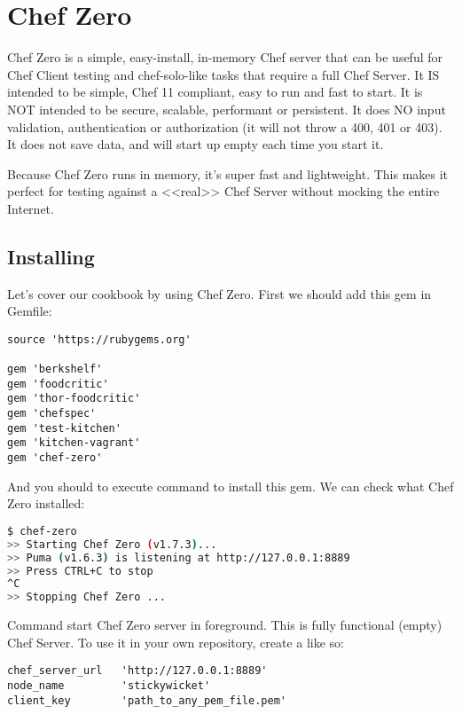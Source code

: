 \section{Chef Zero}
\label{sec:testing-chef-zero}

Chef Zero is a simple, easy-install, in-memory Chef server that can be useful for Chef Client testing and chef-solo-like tasks that require a full Chef Server. It IS intended to be simple, Chef 11 compliant, easy to run and fast to start. It is NOT intended to be secure, scalable, performant or persistent. It does NO input validation, authentication or authorization (it will not throw a 400, 401 or 403). It does not save data, and will start up empty each time you start it.

Because Chef Zero runs in memory, it's super fast and lightweight. This makes it perfect for testing against a <<real>> Chef Server without mocking the entire Internet.

\subsection{Installing}

Let's cover our cookbook by using Chef Zero. First we should add this gem in Gemfile:

\begin{lstlisting}[label=lst:testing-chef-zero1]
source 'https://rubygems.org'

gem 'berkshelf'
gem 'foodcritic'
gem 'thor-foodcritic'
gem 'chefspec'
gem 'test-kitchen'
gem 'kitchen-vagrant'
gem 'chef-zero'
\end{lstlisting}

And you should to execute  command to install this gem. We can check what Chef Zero installed:

\begin{lstlisting}[language=Bash,label=lst:testing-chef-zero2]
$ chef-zero
>> Starting Chef Zero (v1.7.3)...
>> Puma (v1.6.3) is listening at http://127.0.0.1:8889
>> Press CTRL+C to stop
^C
>> Stopping Chef Zero ...
\end{lstlisting}

Command  start Chef Zero server in foreground. This is fully functional (empty) Chef Server. To use it in your own repository, create a  like so:

\begin{lstlisting}[label=lst:testing-chef-zero3]
chef_server_url   'http://127.0.0.1:8889'
node_name         'stickywicket'
client_key        'path_to_any_pem_file.pem'
\end{lstlisting}

